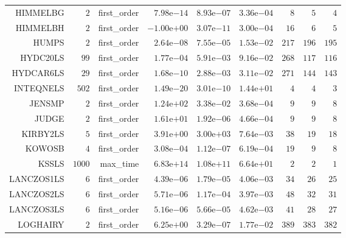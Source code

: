 \begin{longtable}{rrrrrrrrr}
HIMMELBG & \(     2\) & first\_order & \( 7.98\)e\(-14\) & \( 8.93\)e\(-07\) & \( 3.36\)e\(-04\) & \(     8\) & \(     5\) & \(     4\) \\
HIMMELBH & \(     2\) & first\_order & \(-1.00\)e\(+00\) & \( 3.07\)e\(-11\) & \( 3.00\)e\(-04\) & \(    16\) & \(     6\) & \(     5\) \\
HUMPS & \(     2\) & first\_order & \( 2.64\)e\(-08\) & \( 7.55\)e\(-05\) & \( 1.53\)e\(-02\) & \(   217\) & \(   196\) & \(   195\) \\
HYDC20LS & \(    99\) & first\_order & \( 1.77\)e\(-04\) & \( 5.91\)e\(-03\) & \( 9.16\)e\(-02\) & \(   268\) & \(   117\) & \(   116\) \\
HYDCAR6LS & \(    29\) & first\_order & \( 1.68\)e\(-10\) & \( 2.88\)e\(-03\) & \( 3.11\)e\(-02\) & \(   271\) & \(   144\) & \(   143\) \\
INTEQNELS & \(   502\) & first\_order & \( 1.49\)e\(-20\) & \( 3.01\)e\(-10\) & \( 1.44\)e\(+01\) & \(     4\) & \(     4\) & \(     3\) \\
JENSMP & \(     2\) & first\_order & \( 1.24\)e\(+02\) & \( 3.38\)e\(-02\) & \( 3.68\)e\(-04\) & \(     9\) & \(     9\) & \(     8\) \\
JUDGE & \(     2\) & first\_order & \( 1.61\)e\(+01\) & \( 1.92\)e\(-06\) & \( 4.66\)e\(-04\) & \(     9\) & \(     9\) & \(     8\) \\
KIRBY2LS & \(     5\) & first\_order & \( 3.91\)e\(+00\) & \( 3.00\)e\(+03\) & \( 7.64\)e\(-03\) & \(    38\) & \(    19\) & \(    18\) \\
KOWOSB & \(     4\) & first\_order & \( 3.08\)e\(-04\) & \( 1.12\)e\(-07\) & \( 6.19\)e\(-04\) & \(    19\) & \(     9\) & \(     8\) \\
KSSLS & \(  1000\) & max\_time & \( 6.83\)e\(+14\) & \( 1.08\)e\(+11\) & \( 6.64\)e\(+01\) & \(     2\) & \(     2\) & \(     1\) \\
LANCZOS1LS & \(     6\) & first\_order & \( 4.39\)e\(-06\) & \( 1.79\)e\(-05\) & \( 4.06\)e\(-03\) & \(    34\) & \(    26\) & \(    25\) \\
LANCZOS2LS & \(     6\) & first\_order & \( 5.71\)e\(-06\) & \( 1.17\)e\(-04\) & \( 3.97\)e\(-03\) & \(    48\) & \(    32\) & \(    31\) \\
LANCZOS3LS & \(     6\) & first\_order & \( 5.16\)e\(-06\) & \( 5.66\)e\(-05\) & \( 4.62\)e\(-03\) & \(    41\) & \(    28\) & \(    27\) \\
LOGHAIRY & \(     2\) & first\_order & \( 6.25\)e\(+00\) & \( 3.29\)e\(-07\) & \( 1.77\)e\(-02\) & \(   389\) & \(   383\) & \(   382\) \\

\end{longtable}
